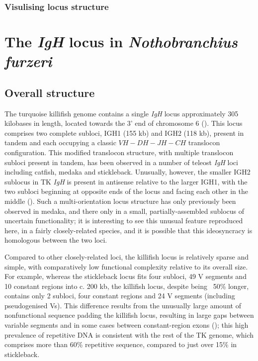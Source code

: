 \subsubsection{Visulising locus structure}

\section{The \textit{IgH} locus in \textit{Nothobranchius furzeri}}
\label{sec:nfu-locus}


	\subsection{Overall structure}
	\label{sec:nfu-locus-structure}
	
	The turquoise killifish genome contains a single \textit{IgH} locus approximately 305 kilobases in length, located towards the 3' end of chromosome 6 ().
	This locus comprises two complete subloci, IGH1 (155 kb) and IGH2 (118 kb), present in tandem and each occupying a classic ${VH-DH-JH-CH}$ translocon configuration. This modified translocon structure, with multiple translocon subloci present in tandem, has been observed in a number of teleost \textit{IgH} loci including catfish, medaka and stickleback. Unusually, however, the smaller IGH2 sublocus in TK \textit{IgH} is present in antisense relative to the larger IGH1, with the two subloci beginning at opposite ends of the locus and facing each other in the middle (). Such a multi-orientation locus structure has only previously been observed in medaka, and there only in a small, partially-assembled sublocus of uncertain functionality; it is interesting to see this unusual feature reproduced here, in a fairly closely-related species, and it is possible that this ideosyncracy is homologous between the two loci. %
	
	Compared to other closely-related loci, the killifish locus is relatively sparse and simple, with comparatively low functional complexity relative to its overall size. For example, whereas the stickleback locus fits four subloci, 49 V segments and 10 constant regions into c. 200 kb, the killifish locus, despite being ~50\% longer, contains only 2 subloci, four constant regions and 24 V segments (including pseudogenised Vs). This difference results from the unusually large amount of nonfunctional sequence padding the killifish locus, resulting in large gaps between variable segments and in some cases between constant-region exons (); this high prevalence of repetitive DNA is consistent with the rest of the TK genome, which comprises more than 60\% repetitive sequence, compared to just over 15\% in stickleback.
	
